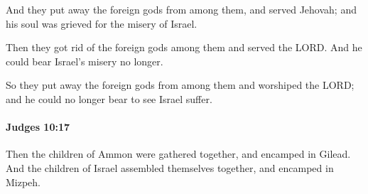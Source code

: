 			\begin{versebox}
					\item[BHS] 
					\item[ASV] And they put away the foreign gods from among them, and served Jehovah; and his soul was grieved for the misery of Israel.
					\item[NIV] Then they got rid of the foreign gods among them and served the LORD. And he could bear Israel’s misery no longer.
					\item[NRSV] So they put away the foreign gods from among them and worshiped the LORD; and he could no longer bear to see Israel suffer.
			\end{versebox}

		\paragraph{Judges 10:17} %
			\label{JUDGES-10-17}

			Then the children of Ammon were gathered together, and encamped in Gilead. And the children of Israel assembled themselves together, and encamped in Mizpeh.

